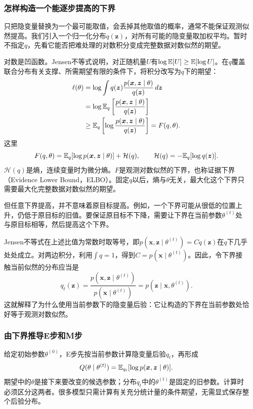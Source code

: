 \subsubsection{怎样构造一个能逐步提高的下界}
只把隐变量替换为一个最可能取值，会丢掉其他取值的概率，通常不能保证观测似然提高。我们引入一个归一化分布$q(\bm z)$，对所有可能的隐变量取加权平均。暂时不指定$q$，先看它能否把难处理的对数积分变成完整数据对数似然的期望。

对数是凹函数。Jensen不等式说明，对正随机量$U$有$\log\mathbb{E}[U]\geq\mathbb{E}[\log U]$。在$q$覆盖联合分布有关支撑、所需期望有限的条件下，将积分改写为$q$下的期望：
\begin{align}
 \ell(\theta)
 &=\log\int q(\bm z)\frac{p(\bm x,\bm z\mid\theta)}{q(\bm z)}\,d\bm z\\
 &=\log\mathbb{E}_q\left[\frac{p(\bm x,\bm z\mid\theta)}{q(\bm z)}\right]\\
 &\geq\mathbb{E}_q\left[\log\frac{p(\bm x,\bm z\mid\theta)}{q(\bm z)}\right]
 =F(q,\theta).
 \label{eq:solving-em-jensen}
\end{align}
这里
\begin{equation}
 F(q,\theta)=\mathbb{E}_q[\log p(\bm x,\bm z\mid\theta)]+\mathcal H(q),\qquad
 \mathcal H(q)=-\mathbb{E}_q[\log q(\bm z)].
\end{equation}
$\mathcal H(q)$是熵，连续变量时为微分熵。$F$是观测对数似然的下界，也称证据下界（Evidence Lower Bound，ELBO）。固定$q$以后，熵与$\theta$无关，最大化这个下界只需要最大化完整数据对数似然的期望。

但任意下界提高，并不意味着原目标提高。例如，一个下界可能从很低的位置上升，仍低于原目标的旧值。要保证原目标不下降，需要让下界在当前参数$\theta^{(t)}$处与原目标相等，然后提高这个下界。

Jensen不等式在上述比值为常数时取等号，即$p(\bm x,\bm z\mid\theta^{(t)})=Cq(\bm z)$在$q$下几乎处处成立。对两边积分，利用$\int q=1$，得到$C=p(\bm x\mid\theta^{(t)})$。因此，令下界接触当前似然的分布应当是
\begin{equation}
 q_t(\bm z)=\frac{p(\bm x,\bm z\mid\theta^{(t)})}{p(\bm x\mid\theta^{(t)})}
 =p(\bm z\mid\bm x,\theta^{(t)}).
\end{equation}
这就解释了为什么使用当前参数下的隐变量后验：它让构造的下界在当前参数处恰好等于观测对数似然。

\subsubsection{由下界推导E步和M步}
给定初始参数$\theta^{(0)}$，E步先按当前参数计算隐变量后验$q_t$，再形成
\begin{equation}
 Q(\theta\mid\theta^{(t)})=\mathbb{E}_{q_t}[\log p(\bm x,\bm z\mid\theta)].
 \label{eq:solving-em-q}
\end{equation}
期望中的$\theta$是接下来要改变的候选参数；分布$q_t$中的$\theta^{(t)}$是固定的旧参数。计算时必须区分这两者。很多模型只需计算有关充分统计量的条件期望，无需显式保存整个后验分布。

